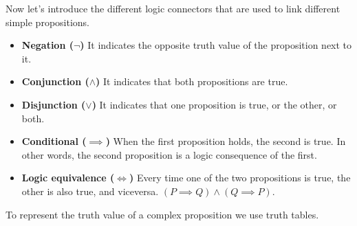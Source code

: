 Now let's introduce the different logic connectors that are used to link different simple propositions.
\begin{itemize}[itemsep = -1pt, topsep = -1pt]
    \item\textbf{Negation ($\neg$)} It indicates the opposite truth value of the proposition next to it.
    \item\textbf{Conjunction ($\land$)} It indicates that both propositions are true.
    \item\textbf{Disjunction ($\lor$)} It indicates that one proposition is true, or the other, or both.
    \item\textbf{Conditional ($\implies$)} When the first proposition holds, the second is true. In other words, the 
        second proposition is a logic consequence of the first.
    \item\textbf{Logic equivalence ($\iff$)} Every time one of the two propositions is true, the other is also true, and 
        viceversa. $\left(P\implies Q\right)\land\left(Q\implies P\right)$.
\end{itemize}


To represent the truth value of a complex proposition we use truth tables.

